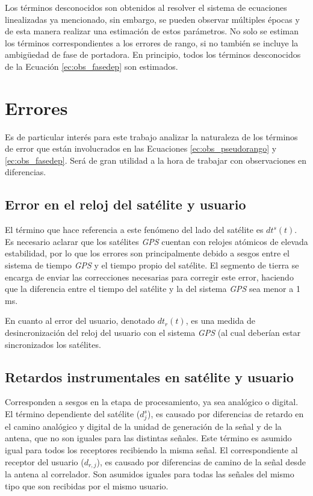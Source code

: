 \documentclass[a4paper,12pt,oneside,onecolumn,final,openright]{book}%
\begin{document}
	Los términos desconocidos son obtenidos al resolver el sistema de ecuaciones linealizadas ya mencionado, sin embargo, se pueden observar múltiples épocas y de esta manera realizar una estimación de estos parámetros. No solo se estiman los términos correspondientes a los errores de rango, si no también se incluye la ambigüedad de fase de portadora. En principio, todos los términos desconocidos de la Ecuación \ref{ec:obs_fasedep} son estimados. 
\section{Errores}\label{sec:errores}
	Es de particular interés para este trabajo analizar la naturaleza de los términos de error que están involucrados en las Ecuaciones \ref{ec:obs_pseudorango} y \ref{ec:obs_fasedep}. Será de gran utilidad a la hora de trabajar con observaciones en diferencias. 
\subsection{Error en el reloj del satélite y usuario}
	El término que hace referencia a este fenómeno del lado del satélite es $dt^s(t)$. Es necesario aclarar que los satélites \textit{GPS} cuentan con relojes atómicos de elevada estabilidad, por lo que los errores son principalmente debido a sesgos entre el sistema de tiempo \textit{GPS} y el tiempo propio del satélite. El segmento de tierra se encarga de enviar las correcciones necesarias para corregir este error, haciendo que la diferencia entre el tiempo del satélite y la del sistema \textit{GPS} sea menor a 1 ms. 
	
	En cuanto al error del usuario, denotado $dt_r(t)$, es una medida de desincronización del reloj del usuario con el sistema \textit{GPS} (al cual deberían estar sincronizados los satélites. 
\subsection{Retardos instrumentales en satélite y usuario}
	Corresponden a sesgos en la etapa de procesamiento, ya sea analógico o digital. El término dependiente del satélite ($d_j^s$), es causado por diferencias de retardo en el camino analógico y digital de la unidad de generación de la señal y de la antena, que no son iguales para las distintas señales. Este término es asumido igual para todos los receptores recibiendo la misma señal. El correspondiente al receptor del usuario ($d_{r,j}$), es causado por diferencias de camino de la señal desde la antena al correlador. Son asumidos iguales para todas las señales del mismo tipo que son recibidas por el mismo usuario.
	
\end{document}
